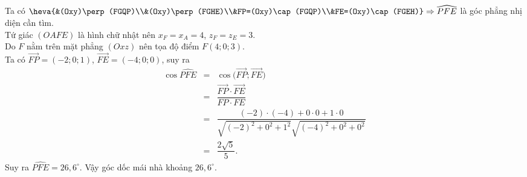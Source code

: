 \begin{bt}
{		Ta có  $\heva{&(Oxy)\perp (FGQP)\\&(Oxy)\perp (FGHE)\\&FP=(Oxy)\cap (FGQP)\\&FE=(Oxy)\cap (FGEH)}\Rightarrow \widehat {PFE}$ là góc phẳng nhị diện cần tìm.\\
		Tứ giác $(OAFE)$ là hình chữ nhật nên  $x_F=x_A=4$, $z_F=z_E=3$.\\
		Do $F$ nằm trên mặt phẳng $(Oxz)$ nên  tọa độ điểm $F(4;0;3)$.\\
		Ta có  $\overrightarrow{FP}=(-2;0;1)$, $\overrightarrow{FE}=(-4;0;0)$, suy ra
		\begin{eqnarray*}
			\cos  \widehat{PFE}&=&\cos \big(\overrightarrow{FP};\overrightarrow{FE}\big)\\
			&=&\dfrac{\overrightarrow{FP}\cdot  \overrightarrow{FE}}{FP\cdot FE}\\
			&=&\dfrac{(-2)\cdot(-4)+0\cdot0+1\cdot0}{\sqrt{(-2)^2+0^2+1^2}\sqrt{(-4)^2+0^2+0^2}}\\ 
			 &=&\dfrac{2\sqrt{5}}{5}.
		\end{eqnarray*}
		Suy ra $\widehat{PFE}=26{,}6^\circ$. Vậy góc dốc mái nhà  khoảng $26{,}6^\circ$.
	} 
\end{bt}

